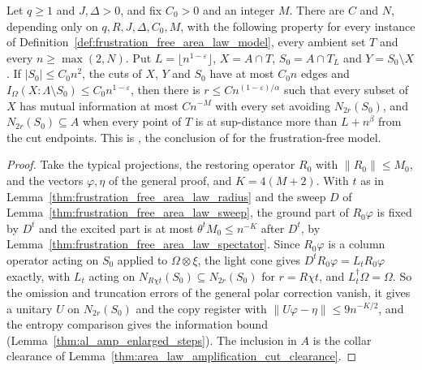 \begin{lemma}
    \label{thm:frustration_free_area_law_amplification}
    \leanok
    Let $q\ge1$ and $J,\Delta>0$, and fix $C_0>0$ and an integer $M$. There are $C$ and $N$, depending only on
    $q,R,J,\Delta,C_0,M$, with the following property for every instance of
    Definition~\ref{def:frustration_free_area_law_model}, every ambient set $T$ and every
    $n\ge\max(2,N)$. Put $L=\lfloor n^{1-\varepsilon}\rfloor$, $X=A\cap T$,
    $S_0=A\cap T_L$ and $Y=S_0\setminus X$. If $|S_0|\le C_0n^2$, the cuts of
    $X$, $Y$ and $S_0$ have at most $C_0n$ edges and
    $I_\Omega(X:\Lambda\setminus S_0)\le C_0n^{1-\varepsilon}$, then there is
    $r\le Cn^{(1-\varepsilon)/\alpha}$ such that every subset of $X$ has
    mutual information at most $Cn^{-M}$ with every set avoiding
    $N_{2r}(S_0)$, and $N_{2r}(S_0)\subseteq A$ when every point of $T$ is at
    sup-distance more than $L+n^\beta$ from the cut endpoints. This is
    \cite[eq.~(far)]{TNLean2026FrustrationFreeNote}, the conclusion of
    \cite[Proposition~10.2]{OpenAI2026AreaLaw} for the frustration-free model.
\end{lemma}

\begin{proof}\leanok
    Take the typical projections, the restoring operator $R_0$ with
    $\|R_0\|\le M_0$, and the vectors $\varphi,\eta$ of the general proof, and
    $K=4(M+2)$. With $t$ as in Lemma~\ref{thm:frustration_free_area_law_radius} and the
    sweep $D$ of Lemma~\ref{thm:frustration_free_area_law_sweep}, the ground part of
    $R_0\varphi$ is fixed by $D^t$ and the excited part is at most
    $\theta^tM_0\le n^{-K}$ after $D^t$, by
    Lemma~\ref{thm:frustration_free_area_law_spectator}. Since $R_0\varphi$ is a column
    operator acting on $S_0$ applied to $\Omega\otimes\xi$, the light cone
    gives $D^tR_0\varphi=L_tR_0\varphi$ exactly, with $L_t$ acting on
    $N_{R\chi t}(S_0)\subseteq N_{2r}(S_0)$ for $r=R\chi t$, and
    $L_t^\dagger\Omega=\Omega$. So the omission and truncation errors of the
    general polar correction vanish, it gives a unitary $U$ on $N_{2r}(S_0)$
    and the copy register with $\|U\varphi-\eta\|\le9n^{-K/2}$, and the
    entropy comparison gives the information bound
    (Lemma~\ref{thm:al_amp_enlarged_steps}). The inclusion in $A$ is the
    collar clearance of Lemma~\ref{thm:area_law_amplification_cut_clearance}.
\end{proof}

